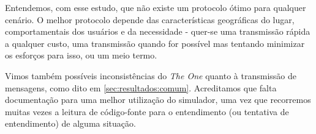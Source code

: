 \documentclass[conference]{IEEEtran}
\begin{document}
Entendemos, com esse estudo, que não existe um protocolo ótimo para qualquer cenário. O melhor protocolo depende das características geográficas do lugar, comportamentais dos usuários e da necessidade - quer-se uma transmissão rápida a qualquer custo, uma transmissão quando for possível mas tentando minimizar os esforços para isso, ou um meio termo.

Vimos também possíveis inconsistências do \emph{The One} quanto à transmissão de mensagens, como dito em \ref{sec:resultados:comum}. 
Acreditamos que falta documentação para uma melhor utilização do simulador, uma vez que recorremos muitas vezes a leitura de código-fonte para o entendimento (ou tentativa de entendimento) de alguma situação.

%
%



%
%
\end{document}
